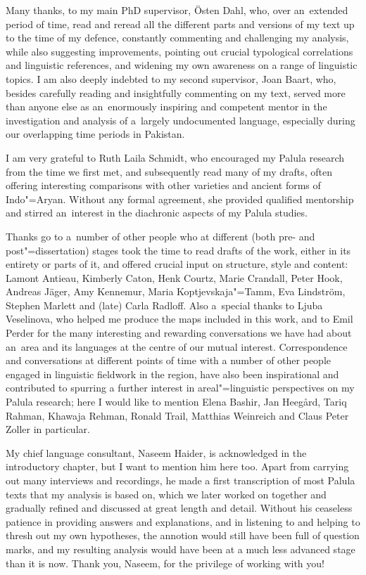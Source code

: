\begin{refsection}
Many thanks, to my main PhD supervisor, Östen Dahl, who, over
an~extended period of time, read and reread all the different parts and versions of my text up to the time of my defence, constantly commenting and challenging my analysis, while also suggesting improvements, pointing out crucial typological correlations and linguistic references, and widening my own awareness on a range of linguistic topics. I am also deeply indebted to my second supervisor, Joan Baart, who,
besides carefully reading and insightfully commenting on my text, served more than anyone else as an~enormously inspiring and competent mentor in the investigation and analysis of a~largely undocumented language, especially during our overlapping time periods in Pakistan.


I am very grateful to Ruth Laila Schmidt, who encouraged my Palula research from the time we first met, and subsequently read many of my drafts, often offering interesting comparisons with other  varieties and ancient forms of Indo"=Aryan. Without any formal agreement, she
provided qualified mentorship and stirred an~interest in the diachronic aspects of my Palula studies.


Thanks go to a~number of other people who at different (both pre- and post"=dissertation) stages took the time to read drafts of the work, either in its entirety or parts of it, and offered crucial input on structure, style and content: Lamont Antieau, Kimberly Caton, Henk Courtz, Marie Crandall, Peter Hook, Andreas Jäger, Amy Kennemur, Maria Koptjevskaja"=Tamm, Eva Lindström, Stephen Marlett and (late) Carla Radloff. Also a~special thanks to Ljuba Veselinova, who helped me produce the maps included in this work, and to Emil Perder for the many interesting and rewarding conversations we have had about
an~area and its languages at the centre of our mutual interest. Correspondence and conversations at different points of time with a number of other people engaged in linguistic fieldwork in the region, have also been inspirational and contributed to spurring a further interest in areal"=linguistic perspectives on my Palula research; here I would like to mention Elena Bashir, Jan Heegård, Tariq Rahman, Khawaja Rehman, Ronald Trail, Matthias Weinreich and Claus Peter Zoller in particular.


My chief language consultant, Naseem Haider, is acknowledged in the introductory chapter, but I want to mention him here too. Apart from carrying out many interviews and recordings, he made a first transcription of most Palula texts that my analysis is based on, which we later worked on together and gradually refined and discussed at great length and detail. Without his ceaseless patience in providing answers and explanations, and in listening to and helping to thresh out my own hypotheses, the annotion would still have been full of question marks, and my resulting analysis would have been at a much less advanced stage than it is now. Thank you, Naseem, for the privilege of working with you!



\end{refsection}

